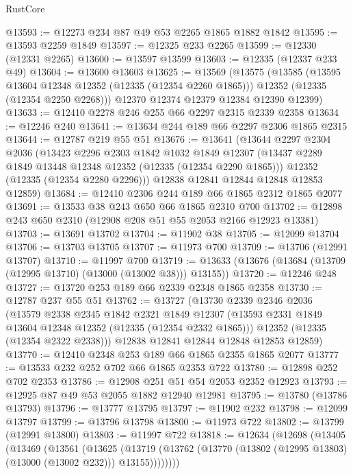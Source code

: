 \begin{lexlean}{RustCore}
\begin{coremodule}
@13593 := @12273 @234 @87 @49 @53 @2265 @1865 @1882 @1842
@13595 := @13593 @2259 @1849
@13597 := @12325 @233 @2265
@13599 := @12330 (@12331 @2265)
@13600 := @13597 @13599
@13603 := @12335 (@12337 @233 @49)
@13604 := @13600 @13603
@13625 := @13569
    (@13575
      (@13585
        (@13595 @13604 @12348 @12352 (@12335 (@12354 @2260 @1865)))
        @12352
        (@12335 (@12354 @2250 @2268)))
      @12370
      @12374
      @12379
      @12384
      @12390
      @12399)
@13633 := @12410 @2278 @246 @255 @66 @2297 @2315 @2339 @2358
@13634 := @12246 @240
@13641 := @13634 @244 @189 @66 @2297 @2306 @1865 @2315
@13644 := @12787 @219 @55 @51
@13676 := @13641
    (@13644
      @2297
      @2304
      @2036
      (@13423
        @2296
        @2303
        @1842
        @1032
        @1849
        @12307
        (@13437 @2289 @1849 @13448 @12348 @12352 (@12335 (@12354 @2290 @1865)))
        @12352
        (@12335 (@12354 @2280 @2296)))
      @12838
      @12841
      @12844
      @12848
      @12853
      @12859)
@13684 := @12410 @2306 @244 @189 @66 @1865 @2312 @1865 @2077
@13691 := @13533 @38 @243 @650 @66 @1865 @2310 @700
@13702 := @12898 @243 @650 @2310 (@12908 @208 @51 @55 @2053 @2166 @12923 @13381)
@13703 := @13691 @13702
@13704 := @11902 @38
@13705 := @12099 @13704
@13706 := @13703 @13705
@13707 := @11973 @700
@13709 := @13706 (@12991 @13707)
@13710 := @11997 @700
@13719 := @13633 (@13676 (@13684 (@13709 (@12995 @13710) (@13000 (@13002 @38))) @13155))
@13720 := @12246 @248
@13727 := @13720 @253 @189 @66 @2339 @2348 @1865 @2358
@13730 := @12787 @237 @55 @51
@13762 := @13727
    (@13730
      @2339
      @2346
      @2036
      (@13579
        @2338
        @2345
        @1842
        @2321
        @1849
        @12307
        (@13593 @2331 @1849 @13604 @12348 @12352 (@12335 (@12354 @2332 @1865)))
        @12352
        (@12335 (@12354 @2322 @2338)))
      @12838
      @12841
      @12844
      @12848
      @12853
      @12859)
@13770 := @12410 @2348 @253 @189 @66 @1865 @2355 @1865 @2077
@13777 := @13533 @232 @252 @702 @66 @1865 @2353 @722
@13780 := @12898 @252 @702 @2353
@13786 := @12908 @251 @51 @54 @2053 @2352 @12923
@13793 := @12925 @87 @49 @53 @2055 @1882 @12940 @12981
@13795 := @13780 (@13786 @13793)
@13796 := @13777 @13795
@13797 := @11902 @232
@13798 := @12099 @13797
@13799 := @13796 @13798
@13800 := @11973 @722
@13802 := @13799 (@12991 @13800)
@13803 := @11997 @722
@13818 := @12634
    (@12698
      (@13405
        (@13469
          (@13561
            (@13625
              (@13719 (@13762 (@13770 (@13802 (@12995 @13803) (@13000 (@13002 @232))) @13155))))))))

\end{coremodule}
\end{lexlean}
